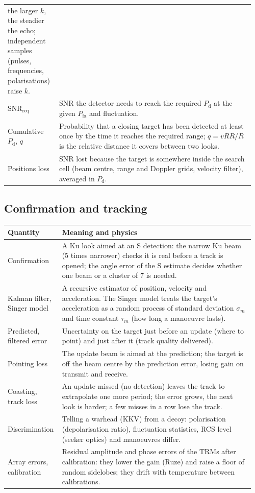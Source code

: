 \documentclass[11pt,a4paper]{article}
\newcommand{\SNR}{\mathrm{SNR}}
\newcommand{\Pd}{P_{\mathrm d}}
\newcommand{\Pfa}{P_{\mathrm{fa}}}
\begin{document}
{\begin{longtable}{@{}p{0.2\linewidth}p{0.76\linewidth}@{}}
the larger $k$, the steadier the echo; independent samples (pulses, frequencies, polarisations) raise $k$.\\
$\SNR_{\mathrm{req}}$ & SNR the detector needs to reach the required $\Pd$ at the given $\Pfa$ and fluctuation.\\
Cumulative $\Pd$, $q$ & Probability that a closing target has been detected at least once by the time it reaches the
required range; $q = vRR/R$ is the relative distance it covers between two looks.\\
Positions loss & SNR lost because the target is somewhere inside the search cell (beam centre, range and Doppler
grids, velocity filter), averaged in $\Pd$.\\
\bottomrule
\end{longtable}}

\subsection{Confirmation and tracking}
{\small
\begin{longtable}{@{}p{0.2\linewidth}p{0.76\linewidth}@{}}
\toprule
Quantity & Meaning and physics\\
\midrule
\endhead
Confirmation & A Ku look aimed at an S detection: the narrow Ku beam (5 times narrower) checks it is real before a
track is opened; the angle error of the S estimate decides whether one beam or a cluster of 7 is needed.\\
Kalman filter, Singer model & A recursive estimator of position, velocity and acceleration. The Singer model treats the
target's acceleration as a random process of standard deviation $\sigma_m$ and time constant $\tau_m$ (how long a
manoeuvre lasts).\\
Predicted, filtered error & Uncertainty on the target just before an update (where to point) and just after it (track
quality delivered).\\
Pointing loss & The update beam is aimed at the prediction; the target is off the beam centre by the prediction error,
losing gain on transmit and receive.\\
Coasting, track loss & An update missed (no detection) leaves the track to extrapolate one more period; the error grows,
the next look is harder; a few misses in a row lose the track.\\
Discrimination & Telling a warhead (KKV) from a decoy: polarisation (depolarisation ratio), fluctuation statistics,
RCS level (seeker optics) and manoeuvres differ.\\
Array errors, calibration & Residual amplitude and phase errors of the TRMs after calibration: they lower the gain (Ruze)
and raise a floor of random sidelobes; they drift with temperature between calibrations.\\
\bottomrule
\end{longtable}}
\end{document}
